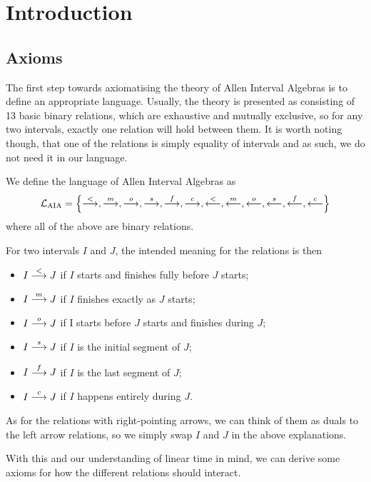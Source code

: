 \documentclass[../main.tex]{subfiles}
\begin{document}
\section{Introduction}%
\label{sec:introduction}

\subsection{Axioms}%
\label{sub:axioms}

The first step towards axiomatising the theory of Allen Interval Algebras is to define an
appropriate language. Usually, the theory is presented as consisting of 13 basic binary relations,
which are exhaustive and mutually exclusive, so for any two intervals, exactly one relation will
hold between them. It is worth noting though, that one of the relations is simply equality of
intervals and as such, we do not need it in our language.

\begin{defn}
  We define the language of Allen Interval Algebras as
  \begin{equation*}
    \mathcal{L}_\text{AIA} = \left\{
      \overset{<}{\longrightarrow}, \overset{m}{\longrightarrow}, \overset{o}{\longrightarrow},     \overset{s}{\longrightarrow},    \overset{f}{\longrightarrow},   \overset{c}{\longrightarrow},
      \overset{<}{\longleftarrow},  \overset{m}{\longleftarrow}, \overset{o}{\longleftarrow}, \overset{s}{\longleftarrow}, \overset{f}{\longleftarrow}, \overset{c}{\longleftarrow}
    \right\}
  \end{equation*}
  where all of the above are binary relations.
\end{defn}

For two intervals $I$ and $J$, the intended meaning for the relations is then
\begin{itemize}
  \item $I \overset{<}{\longrightarrow} J$ if $I$ starts and finishes fully before $J$ starts;
  \item $I \overset{m}{\longrightarrow} J$ if $I$ finishes exactly as $J$ starts;
  \item $I \overset{o}{\longrightarrow} J$ if I starts before $J$ starts and finishes during $J$;
  \item $I \overset{s}{\longrightarrow} J$ if $I$ is the initial segment of $J$;
  \item $I \overset{f}{\longrightarrow} J$ if $I$ is the last segment of $J$;
  \item $I \overset{c}{\longrightarrow} J$ if $I$ happens entirely during $J$.
\end{itemize}
As for the relations with right-pointing arrows, we can think of them as duals to the left arrow
relations, so we simply swap $I$ and $J$ in the above explanations.

With this and our understanding of linear time in mind, we can derive some axioms for how the
different relations should interact.
\end{document}
